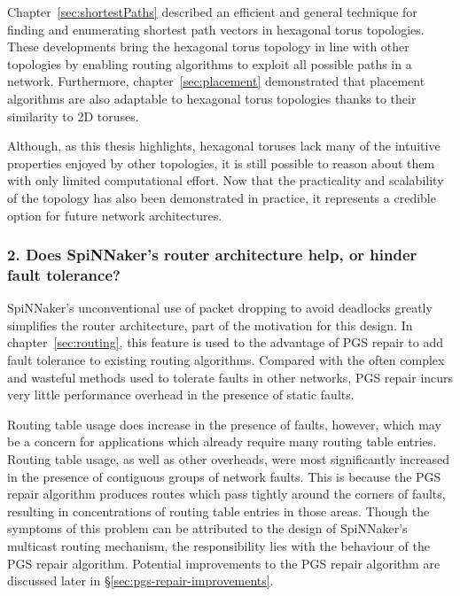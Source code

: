 		Chapter~\ref{sec:shortestPaths} described an efficient and general
		technique for finding and enumerating shortest path vectors in hexagonal
		torus topologies. These developments bring the hexagonal torus topology in
		line with other topologies by enabling routing algorithms to exploit all
		possible paths in a network. Furthermore, chapter~\ref{sec:placement}
		demonstrated that placement algorithms are also adaptable to hexagonal
		torus topologies thanks to their similarity to 2D toruses.
		
		Although, as this thesis highlights, hexagonal toruses lack many of the
		intuitive properties enjoyed by other topologies, it is still possible to
		reason about them with only limited computational effort.  Now that the
		practicality and scalability of the topology has also been demonstrated in
		practice, it represents a credible option for future network architectures.
		
		\subsubsection{2. Does SpiNNaker's router architecture help, or hinder
		fault tolerance?}
		
		SpiNNaker's unconventional use of packet dropping to avoid deadlocks
		greatly simplifies the router architecture, part of the motivation for this
		design. In chapter~\ref{sec:routing}, this feature is used to the advantage
		of PGS repair to add fault tolerance to existing routing algorithms.
		Compared with the often complex and wasteful methods used to tolerate
		faults in other networks, PGS repair incurs very little performance
		overhead in the presence of static faults.
		
		Routing table usage does increase in the presence of faults, however, which
		may be a concern for applications which already require many routing table
		entries. Routing table usage, as well as other overheads, were most
		significantly increased in the presence of contiguous groups of network
		faults. This is because the PGS repair algorithm produces routes which pass
		tightly around the corners of faults, resulting in concentrations of
		routing table entries in those areas.  Though the symptoms of this problem
		can be attributed to the design of SpiNNaker's multicast routing mechanism,
		the responsibility lies with the behaviour of the PGS repair algorithm.
		Potential improvements to the PGS repair algorithm are discussed later in
		\S\ref{sec:pgs-repair-improvements}.
		
